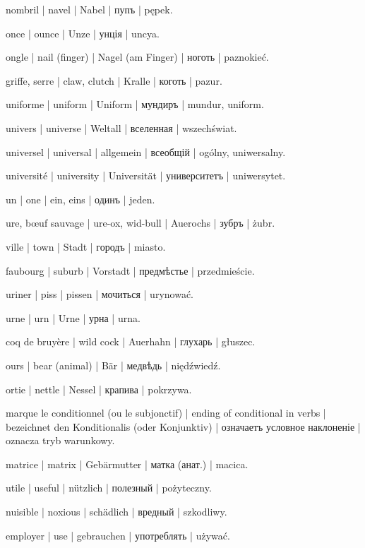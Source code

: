 \begin{outdent}{1em}
nombril | navel | Nabel | пупъ | pępek.

once | ounce | Unze | унція | uncya.

ongle | nail (finger) | Nagel (am Finger) | ноготь | paznokieć.

\uvsubentry{}
griffe, serre | claw, clutch | Kralle | коготь | pazur.

uniforme | uniform | Uniform | мундиръ | mundur, uniform.

univers | universe | Weltall | вселенная | wszechświat.

universel | universal | allgemein | всеобщій | ogólny, uniwersalny.

université | university | Universität | университетъ | uniwersytet.

un | one | ein, eins | одинъ | jeden.

ure, bœuf sauvage | ure-ox, wid-bull | Auerochs | зубръ | żubr.

ville | town | Stadt | городъ | miasto.

\uvsubentry{}
faubourg | suburb | Vorstadt | предмѣстье | przedmieście.

uriner | piss | pissen | мочиться | urynować.

urne | urn | Urne | урна | urna.

coq de bruyère | wild cock | Auerhahn | глухарь | głuszec.

ours | bear (animal) | Bär | медвѣдь | niędźwiedź.

ortie | nettle | Nessel | крапива | pokrzywa.

marque le conditionnel (ou le subjonctif) | ending of conditional
in verbs | bezeichnet den Konditionalis (oder Konjunktiv) | означаетъ
условное наклоненіе | oznacza tryb warunkowy.

matrice | matrix | Gebärmutter | матка (анат.) | macica.

utile | useful | nützlich | полезный | pożyteczny.

\uvsubentry{}
nuisible | noxious | schädlich | вредный | szkodliwy.

employer | use | gebrauchen | употреблять | używać.


\end{outdent}
